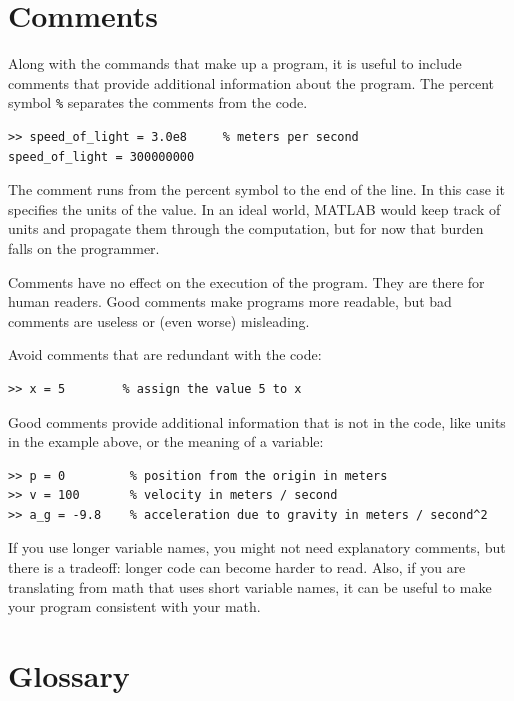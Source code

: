 \documentclass[
]{book}
\begin{document}
\section{Comments}

Along with the commands that make up a program, it is useful
to include comments that provide additional information about the
program.  The percent symbol {\tt \%} separates
the comments from the code.

\begin{verbatim}
>> speed_of_light = 3.0e8     % meters per second
speed_of_light = 300000000
\end{verbatim}

The comment runs from the percent symbol to the end of the line.
In this case it specifies the units of the value.  In an ideal world,
MATLAB would keep track of units and propagate them through the
computation, but for now that burden falls on the programmer.

Comments have no effect on the execution of the program.  They
are there for human readers.  Good comments make programs more
readable, but bad comments are useless or (even worse) misleading.

Avoid comments that are redundant with the code:

\begin{verbatim}
>> x = 5        % assign the value 5 to x
\end{verbatim}

Good comments provide additional information that is not in the
code, like units in the example above, or the meaning of a variable:

\begin{verbatim}
>> p = 0         % position from the origin in meters
>> v = 100       % velocity in meters / second
>> a_g = -9.8    % acceleration due to gravity in meters / second^2
\end{verbatim}

If you use longer variable names, you might not need explanatory
comments, but there is a tradeoff: longer code can become harder
to read.  Also, if you are translating from math
that uses short variable names, it can be useful to make your
program consistent with your math.


\section{Glossary}
\end{document}
